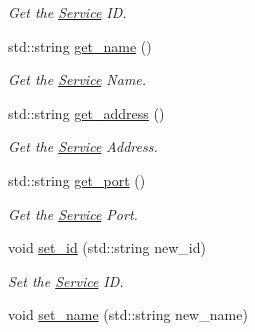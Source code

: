 \begin{DoxyCompactItemize}
\begin{DoxyCompactList}\small\item\em Get the \hyperlink{classService}{Service} I\-D. \end{DoxyCompactList}\item 
\hypertarget{classService_a8b492e0a62e0457a8c5395fbcaa86c15}{std\-::string \hyperlink{classService_a8b492e0a62e0457a8c5395fbcaa86c15}{get\-\_\-name} ()}\label{classService_a8b492e0a62e0457a8c5395fbcaa86c15}

\begin{DoxyCompactList}\small\item\em Get the \hyperlink{classService}{Service} Name. \end{DoxyCompactList}\item 
\hypertarget{classService_acf3e71a82be6a4ba3915ad2039099da6}{std\-::string \hyperlink{classService_acf3e71a82be6a4ba3915ad2039099da6}{get\-\_\-address} ()}\label{classService_acf3e71a82be6a4ba3915ad2039099da6}

\begin{DoxyCompactList}\small\item\em Get the \hyperlink{classService}{Service} Address. \end{DoxyCompactList}\item 
\hypertarget{classService_acca3fc5199b3e85ce7a0cc875e515b72}{std\-::string \hyperlink{classService_acca3fc5199b3e85ce7a0cc875e515b72}{get\-\_\-port} ()}\label{classService_acca3fc5199b3e85ce7a0cc875e515b72}

\begin{DoxyCompactList}\small\item\em Get the \hyperlink{classService}{Service} Port. \end{DoxyCompactList}\item 
\hypertarget{classService_a2ea702a686d8561b43f6283647e18109}{void \hyperlink{classService_a2ea702a686d8561b43f6283647e18109}{set\-\_\-id} (std\-::string new\-\_\-id)}\label{classService_a2ea702a686d8561b43f6283647e18109}

\begin{DoxyCompactList}\small\item\em Set the \hyperlink{classService}{Service} I\-D. \end{DoxyCompactList}\item 
\hypertarget{classService_a8131d07e27a83148512ab82d70948dfc}{void \hyperlink{classService_a8131d07e27a83148512ab82d70948dfc}{set\-\_\-name} (std\-::string new\-\_\-name)}\label{classService_a8131d07e27a83148512ab82d70948dfc}


\end{DoxyCompactItemize}
